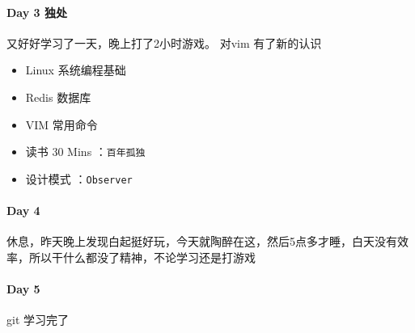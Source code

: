 \documentclass[UTF8,a4paper,8pt]{ctexart}
\begin{document}
	\paragraph{Day 3   独处    \quad     }
		又好好学习了一天，晚上打了2小时游戏。 对vim  有了新的认识
		\begin{itemize}[itemindent = 1em]
			\renewcommand\labelitemi{\makebox[0pt][l]{$\square$}\raisebox{.15ex}{\hspace{0.1em}$\checkmark$}}		
			\item   Linux 系统编程基础
			\item   Redis 数据库
			\item   VIM  常用命令
							
			\renewcommand\labelitemi{\makebox[0pt][l]{$\square$}\hspace{1em}}
			\item   读书  30 Mins	：\verb|百年孤独|
							
			\item   设计模式 ：\verb|Observer| 
		\end{itemize}
	\paragraph{Day 4       \quad     }
		
		休息，昨天晚上发现白起挺好玩，今天就陶醉在这，然后5点多才睡，白天没有效率，所以干什么都没了精神，不论学习还是打游戏
		
	\paragraph{Day 5       \quad     }	
		git  学习完了
		
\end{document}
